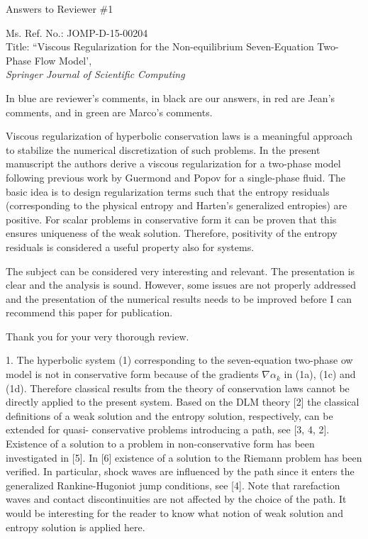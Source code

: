 \documentclass{article}
\begin{document}

\begin{center}
{ \Large Answers to Reviewer \#1}
\end{center}

\bigskip

\noindent Ms. Ref. No.: JOMP-D-15-00204\\
Title: ``Viscous Regularization for the Non-equilibrium Seven-Equation Two-Phase Flow Model', \\
{\it Springer Journal of Scientific Computing}\\

\bigskip

In {\color{blue}blue} are reviewer's comments, in black are our answers, in {\color{red}red} are Jean's comments,
and in {\color{green}green} are Marco's comments.

\bigskip

{\color{blue}
Viscous regularization of hyperbolic conservation laws is a meaningful approach to stabilize
the numerical discretization of such problems. In the present manuscript the authors derive
a viscous regularization for a two-phase model following previous work by Guermond and
Popov for a single-phase fluid. The basic idea is to design regularization terms such that
the entropy residuals (corresponding to the physical entropy and Harten's generalized
entropies) are positive. For scalar problems in conservative form it can be proven that this
ensures uniqueness of the weak solution. Therefore, positivity of the entropy residuals is
considered a useful property also for systems.

The subject can be considered very interesting and relevant. The presentation is clear
and the analysis is sound. However, some issues are not properly addressed and the
presentation of the numerical results needs to be improved before I can recommend this
paper for publication.}

Thank you for your very thorough review. 
\bigskip


{\color{blue}
1. The hyperbolic system (1) corresponding to the seven-equation two-phase ow model
is not in conservative form because of the gradients $\nabla \alpha_k$ in (1a), (1c) and (1d).
Therefore classical results from the theory of conservation laws cannot be directly
applied to the present system. Based on the DLM theory [2] the classical definitions
of a weak solution and the entropy solution, respectively, can be extended for quasi-
conservative problems introducing a path, see [3, 4, 2]. Existence of a solution to
a problem in non-conservative form has been investigated in [5]. In [6] existence of
a solution to the Riemann problem has been verified. In particular, shock waves
are influenced by the path since it enters the generalized Rankine-Hugoniot jump
conditions, see [4]. Note that rarefaction waves and contact discontinuities are not
affected by the choice of the path. It would be interesting for the reader to know
what notion of weak solution and entropy solution is applied here.}
\end{document}
